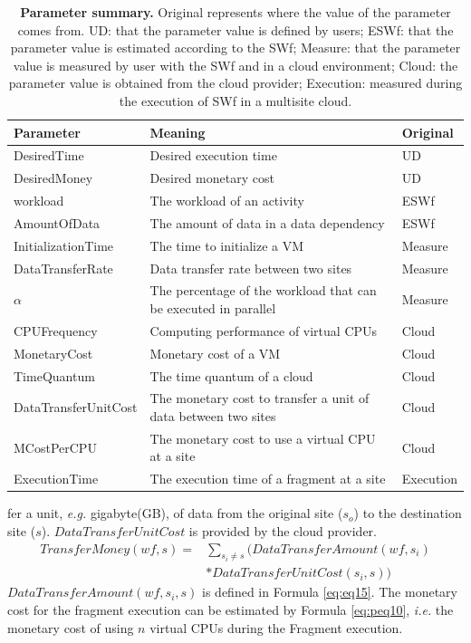 \begin{landscape}
\begin{table}[htbp]
\caption{\textbf{Parameter summary. } Original represents where the value of the parameter comes from. UD: that the parameter value is defined by users; ESWf: that the parameter value is estimated according to the SWf; Measure: that the parameter value is measured by user with the SWf and in a cloud environment; Cloud: the parameter value is obtained from the cloud provider; Execution: measured during the execution of SWf in a multisite cloud.} 
\label{tab:PS}
\begin{centering}
\captionsetup{justification=centering}
\begin{tabular}{|l|l|l|}
\hline 
Parameter & Meaning & Original \tabularnewline
\hline 
DesiredTime & Desired execution time & UD \tabularnewline
DesiredMoney & Desired monetary cost & UD \tabularnewline
workload & The workload of an activity & ESWf  \tabularnewline
AmountOfData & The amount of data in a data dependency& ESWf \tabularnewline
InitializationTime & The time to initialize a VM & Measure \tabularnewline
DataTransferRate & Data transfer rate between two sites & Measure \tabularnewline
$\alpha$ & The percentage of the workload that can be executed in parallel & Measure \tabularnewline
CPUFrequency & Computing performance of virtual CPUs & Cloud \tabularnewline
MonetaryCost & Monetary cost of a VM & Cloud \tabularnewline
TimeQuantum & The time quantum of a cloud & Cloud \tabularnewline
DataTransferUnitCost & The monetary cost to transfer a unit of data between two sites & Cloud \tabularnewline
MCostPerCPU & The monetary cost to use a virtual CPU at a site & Cloud \tabularnewline
ExecutionTime & The execution time of a fragment at a site & Execution \tabularnewline
\hline 
\end{tabular}
\par\end{centering} 
\end{table}
\end{landscape}
\noindent fer a unit, \textit{e.g.} gigabyte(GB), of data from the original site ($s_o$) to the destination site ($s$). $DataTransferUnitCost$ is provided by the cloud provider.
\begin{equation}\label{eq:eq160}
\boxed{
\begin{split}
TransferMoney( wf, s ) = &\sum_{s_i \neq s}(DataTransferAmount( wf, s_i ) \\&* DataTransferUnitCost( s_i, s ))
\end{split}
}
\end{equation}
$DataTransferAmount( wf, s_i, s )$ is defined in Formula \ref{eq:eq15}.
The monetary cost for the fragment execution can be estimated by Formula \ref{eq:peq10}, \textit{i.e.} the monetary cost of using $n$ virtual CPUs during the Fragment execution.


